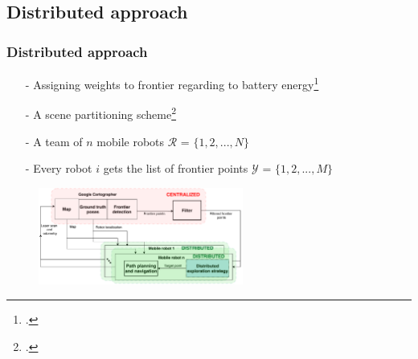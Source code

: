 \subsection{Distributed approach}
\begin{frame}
	\frametitle{Distributed approach}
	\begin{itemize}
		\item[-] Assigning weights to frontier regarding to battery energy\footcite{Benkrid2017}
		\item[-] A scene partitioning scheme\footcite{LopezPerez2018}
	
%		
		\item[-] A team of $n$ mobile robots  \(\text{$\mathcal {R}$}\) = $ \{ 1, 2,..., N\}$
		\item[-] Every robot $i$ gets the list of frontier points  \(\text{$\mathcal {Y}$}\) = $ \{ 1, 2,..., M\}$
	\end{itemize}
	
	\begin{figure}
		\centering
		\includegraphics[width=0.6\textwidth]{figures/diagram_exploration}
	\end{figure}
\end{frame}

